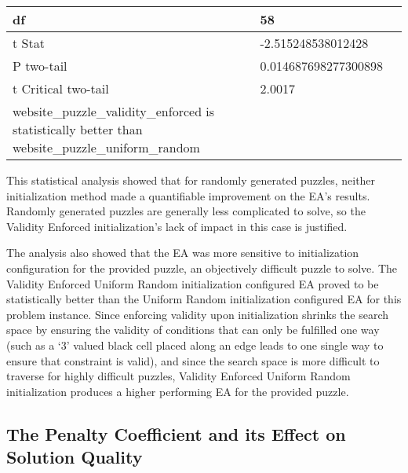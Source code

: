 \documentclass[11pt]{article}
\begin{document}
\begin{table}[H]
{\begin{tabular}{|l|l|l|}
    df                                                                                                & 58                               &                                     \\ \hline
    t Stat                                                                                            & -2.515248538012428               &                                     \\ \hline
    P two-tail                                                                                        & 0.014687698277300898             &                                     \\ \hline
    t Critical two-tail                                                                               & 2.0017                           &                                     \\ \hline
    website\_puzzle\_validity\_enforced is statistically better than website\_puzzle\_uniform\_random &                                  &                                     \\ \hline
    \end{tabular}%
    }
\end{table}


This statistical analysis showed that for randomly generated puzzles, neither initialization method
made a quantifiable improvement on the EA's results. Randomly generated puzzles are generally less
complicated to solve, so the Validity Enforced initialization's lack of impact in this case is justified.

The analysis also showed that the EA was more sensitive to initialization configuration
for the provided puzzle, an objectively difficult puzzle to solve. The Validity Enforced Uniform Random
initialization configured EA proved to be statistically better than the Uniform Random initialization
configured EA for this problem instance. Since enforcing validity upon initialization shrinks the search space by ensuring the validity
of conditions that can only be fulfilled one way (such as a `3' valued black cell placed along an edge leads to one single way to
ensure that constraint is valid), and since the search space is more difficult to traverse for 
highly difficult puzzles, Validity Enforced Uniform Random initialization produces a higher performing EA for 
the provided puzzle.


\subsection{The Penalty Coefficient and its Effect on Solution Quality}
\end{document}
